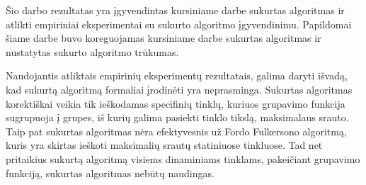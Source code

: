 Šio darbo rezultatas yra įgyvendintas kursiniame darbe sukurtas algoritmas ir atlikti empiriniai eksperimentai su sukurto algoritmo įgyvendinimu. Papildomai šiame darbe buvo koreguojamas kursiniame darbe sukurtas algoritmas ir nustatytas sukurto algoritmo trūkumas.

Naudojantis atliktais empirinių eksperimentų rezultatais, galima daryti išvadą, kad sukurtą algoritmą formaliai įrodinėti yra neprasminga. Sukurtas algoritmas korektiškai veikia tik ieškodamas specifinių tinklų, kuriuos grupavimo funkcija sugrupuoja į grupes, iš kurių galima pasiekti tinklo tikslą, maksimalaus srauto. Taip pat sukurtas algoritmas nėra efektyvesnis už Fordo Fulkersono algoritmą, kuris yra skirtas ieškoti maksimalių srautų statiniuose tinkluose. Tad net pritaikius sukurtą algoritmą visiems dinaminiams tinklams, pakeičiant grupavimo funkciją, sukurtas algoritmas nebūtų naudingas.